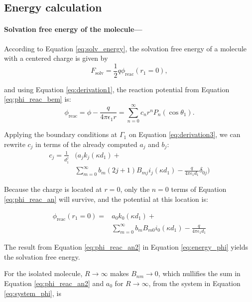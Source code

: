 \subsection{Energy calculation} \label{energy_analytical}


 \medskip
 \paragraph*{Solvation free energy of the molecule---}
According to Equation \eqref{eq:solv_energy}, the solvation free energy of a molecule with a centered charge is given by
%
\begin{equation} \label{eq:energy_phi}
F_{\text{solv}} = \frac{1}{2} q \phi_{\text{reac}}(r_1=0),
\end{equation} 
 
 \noindent and using Equation \eqref{eq:derivation1}, the reaction potential from Equation \eqref{eq:phi_reac_bem} is:
 \begin{equation} \label{eq:phi_reac_an}
 \phi_{\text{reac}} = \phi - \frac{q}{4\pi\epsilon_1 r} = \sum_{n=0}^{\infty} c_n r^n P_n(\cos \theta_1).
 \end{equation}
 
 Applying the boundary conditions at $\Gamma_1$ on Equation  \eqref{eq:derivation3}, we can rewrite $c_j$ in terms of the already computed $a_j$ and $b_j$:
 \begin{align}
 c_j = \frac{1}{d_1^j} & \Big(a_j k_j(\kappa d_1) + \nonumber \\
&  \sum_{m=0}^{\infty} b_m(2j+1)B_{mj} i_j(\kappa d_1) - \frac{q}{4\pi\epsilon_1 d_1} \delta_{0j} \Big)
 \end{align} 
 
Because the charge is located at $r=0$, only the $n=0$ terms of Equation \eqref{eq:phi_reac_an} will survive, and the potential at this location is:
 
 \begin{align} \label{eq:phi_reac_an2}
 \phi_{\text{reac}} (r_1=0) = & a_0 k_0(\kappa d_1) + \nonumber \\
 &\sum_{m=0}^{\infty} b_m B_{m0}i_0(\kappa d_1) - \frac{q}{4\pi\epsilon_1 d_1}
 \end{align}
 
 The result from Equation \eqref{eq:phi_reac_an2} in Equation \eqref{eq:energy_phi} yields the solvation free energy. 
 
For the isolated molecule, $R \to \infty$ makes $B_{nm} \to 0$, which nullifies the sum in Equation \eqref{eq:phi_reac_an2} and $a_0$ for $R \to \infty$, from the system in Equation \eqref{eq:system_phi}, is 

